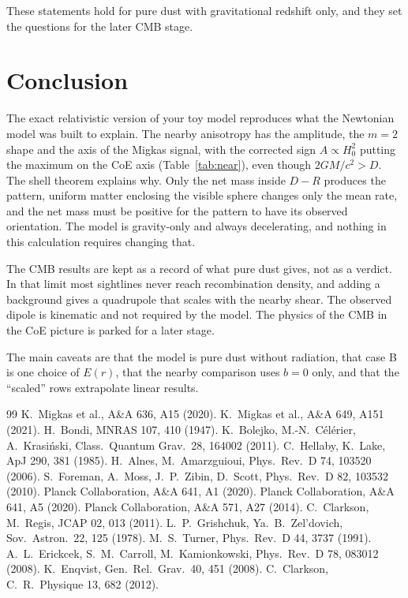 \documentclass[10pt,twocolumn,letterpaper]{article}
\begin{document}
These statements hold for pure dust with gravitational redshift only, and they set the questions for the later CMB stage.

\section{Conclusion}
The exact relativistic version of your toy model reproduces what the Newtonian model was built to explain. The nearby anisotropy has the amplitude, the $m=2$ shape and the axis of the Migkas signal, with the corrected sign $A\propto H_0^2$ putting the maximum on the CoE axis (Table~\ref{tab:near}), even though $2GM/c^2>D$. The shell theorem explains why. Only the net mass inside $D-R$ produces the pattern, uniform matter enclosing the visible sphere changes only the mean rate, and the net mass must be positive for the pattern to have its observed orientation. The model is gravity-only and always decelerating, and nothing in this calculation requires changing that.

The CMB results are kept as a record of what pure dust gives, not as a verdict. In that limit most sightlines never reach recombination density, and adding a background gives a quadrupole that scales with the nearby shear. The observed dipole is kinematic and not required by the model. The physics of the CMB in the CoE picture is parked for a later stage.

The main caveats are that the model is pure dust without radiation, that case B is one choice of $E(r)$, that the nearby comparison uses $b=0$ only, and that the ``scaled'' rows extrapolate linear results.


\small
\begin{thebibliography}{99}\setlength{\itemsep}{0pt}
 K.~Migkas et al., A\&A 636, A15 (2020).
 K.~Migkas et al., A\&A 649, A151 (2021).
 H.~Bondi, MNRAS 107, 410 (1947).
 K.~Bolejko, M.-N.~C\'el\'erier, A.~Krasi\'nski, Class.\ Quantum Grav.\ 28, 164002 (2011).
 C.~Hellaby, K.~Lake, ApJ 290, 381 (1985).
 H.~Alnes, M.~Amarzguioui, Phys.\ Rev.\ D 74, 103520 (2006).
 S.~Foreman, A.~Moss, J.~P.~Zibin, D.~Scott, Phys.\ Rev.\ D 82, 103532 (2010).
 Planck Collaboration, A\&A 641, A1 (2020).
 Planck Collaboration, A\&A 641, A5 (2020).
 Planck Collaboration, A\&A 571, A27 (2014).
 C.~Clarkson, M.~Regis, JCAP 02, 013 (2011).
 L.~P.~Grishchuk, Ya.~B.~Zel'dovich, Sov.\ Astron.\ 22, 125 (1978).
 M.~S.~Turner, Phys.\ Rev.\ D 44, 3737 (1991).
 A.~L.~Erickcek, S.~M.~Carroll, M.~Kamionkowski, Phys.\ Rev.\ D 78, 083012 (2008).
 K.~Enqvist, Gen.\ Rel.\ Grav.\ 40, 451 (2008).
 C.~Clarkson, C.\ R.\ Physique 13, 682 (2012).
\end{thebibliography}
\end{document}
